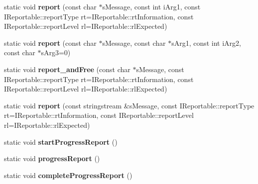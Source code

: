 \begin{DoxyCompactItemize}
\item 
\hypertarget{classgeneral__server_1_1Debug_a8040ceeaa97411e641e927b5be7c4513}{static void {\bfseries report} (const char $\ast$s\-Message, const int i\-Arg1, const \-I\-Reportable\-::report\-Type rt=\-I\-Reportable\-::rt\-Information, const \-I\-Reportable\-::report\-Level rl=\-I\-Reportable\-::rl\-Expected)}\label{classgeneral__server_1_1Debug_a8040ceeaa97411e641e927b5be7c4513}

\item 
\hypertarget{classgeneral__server_1_1Debug_ad7add46358f99dcbac12f1bc26b81a8a}{static void {\bfseries report} (const char $\ast$s\-Message, const char $\ast$s\-Arg1, const int i\-Arg2, const char $\ast$s\-Arg3=0)}\label{classgeneral__server_1_1Debug_ad7add46358f99dcbac12f1bc26b81a8a}

\item 
\hypertarget{classgeneral__server_1_1Debug_ad1fc03a9ce08c397e6215cdab59c86d2}{static void {\bfseries report\-\_\-and\-Free} (const char $\ast$s\-Message, const \-I\-Reportable\-::report\-Type rt=\-I\-Reportable\-::rt\-Information, const \-I\-Reportable\-::report\-Level rl=\-I\-Reportable\-::rl\-Expected)}\label{classgeneral__server_1_1Debug_ad1fc03a9ce08c397e6215cdab59c86d2}

\item 
\hypertarget{classgeneral__server_1_1Debug_a51bd51290a2634f2af55b4df8975d26f}{static void {\bfseries report} (const stringstream \&s\-Message, const \-I\-Reportable\-::report\-Type rt=\-I\-Reportable\-::rt\-Information, const \-I\-Reportable\-::report\-Level rl=\-I\-Reportable\-::rl\-Expected)}\label{classgeneral__server_1_1Debug_a51bd51290a2634f2af55b4df8975d26f}

\item 
\hypertarget{classgeneral__server_1_1Debug_a59e130c722f691bac180526b1499b255}{static void {\bfseries start\-Progress\-Report} ()}\label{classgeneral__server_1_1Debug_a59e130c722f691bac180526b1499b255}

\item 
\hypertarget{classgeneral__server_1_1Debug_a0d547d4e5f153c6f8600c2f5b0163e2a}{static void {\bfseries progress\-Report} ()}\label{classgeneral__server_1_1Debug_a0d547d4e5f153c6f8600c2f5b0163e2a}

\item 
\hypertarget{classgeneral__server_1_1Debug_a4d6be9474de0919258b9b627d2a3420d}{static void {\bfseries complete\-Progress\-Report} ()}\label{classgeneral__server_1_1Debug_a4d6be9474de0919258b9b627d2a3420d}


\end{DoxyCompactItemize}
